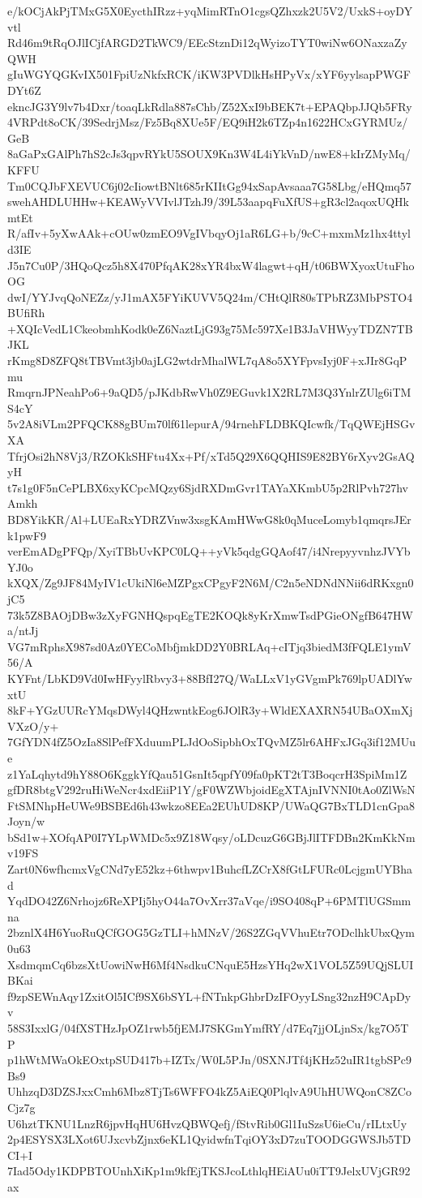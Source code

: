 e/kOCjAkPjTMxG5X0EycthIRzz+yqMimRTnO1cgsQZhxzk2U5V2/UxkS+oyDYvtl
Rd46m9tRqOJlICjfARGD2TkWC9/EEcStznDi12qWyizoTYT0wiNw6ONaxzaZyQWH
gIuWGYQGKvIX501FpiUzNkfxRCK/iKW3PVDlkHsHPyVx/xYF6yylsapPWGFDYt6Z
ekncJG3Y9lv7b4Dxr/toaqLkRdla887sChb/Z52XxI9bBEK7t+EPAQbpJJQb5FRy
4VRPdt8oCK/39SedrjMsz/Fz5Bq8XUe5F/EQ9iH2k6TZp4n1622HCxGYRMUz/GeB
8aGaPxGAlPh7hS2cJs3qpvRYkU5SOUX9Kn3W4L4iYkVnD/nwE8+kIrZMyMq/KFFU
Tm0CQJbFXEVUC6j02cIiowtBNlt685rKIItGg94xSapAvsaaa7G58Lbg/eHQmq57
swehAHDLUHHw+KEAWyVVIvlJTzhJ9/39L53aapqFuXfUS+gR3cl2aqoxUQHkmtEt
R/afIv+5yXwAAk+cOUw0zmEO9VgIVbqyOj1aR6LG+b/9cC+mxmMz1hx4ttyld3IE
J5n7Cu0P/3HQoQcz5h8X470PfqAK28xYR4bxW4lagwt+qH/t06BWXyoxUtuFhoOG
dwI/YYJvqQoNEZz/yJ1mAX5FYiKUVV5Q24m/CHtQlR80sTPbRZ3MbPSTO4BUfiRh
+XQIcVedL1CkeobmhKodk0eZ6NaztLjG93g75Mc597Xe1B3JaVHWyyTDZN7TBJKL
rKmg8D8ZFQ8tTBVmt3jb0ajLG2wtdrMhalWL7qA8o5XYFpvsIyj0F+xJIr8GqPmu
RmqrnJPNeahPo6+9aQD5/pJKdbRwVh0Z9EGuvk1X2RL7M3Q3YnlrZUlg6iTMS4cY
5v2A8iVLm2PFQCK88gBUm70lf61lepurA/94rnehFLDBKQIcwfk/TqQWEjHSGvXA
TfrjOsi2hN8Vj3/RZOKkSHFtu4Xx+Pf/xTd5Q29X6QQHIS9E82BY6rXyv2GsAQyH
t7s1g0F5nCePLBX6xyKCpcMQzy6SjdRXDmGvr1TAYaXKmbU5p2RlPvh727hvAmkh
BD8YikKR/Al+LUEaRxYDRZVnw3xsgKAmHWwG8k0qMuceLomyb1qmqrsJErk1pwF9
verEmADgPFQp/XyiTBbUvKPC0LQ++yVk5qdgGQAof47/i4NrepyyvnhzJVYbYJ0o
kXQX/Zg9JF84MyIV1cUkiNl6eMZPgxCPgyF2N6M/C2n5eNDNdNNii6dRKxgn0jC5
73k5Z8BAOjDBw3zXyFGNHQspqEgTE2KOQk8yKrXmwTsdPGieONgfB647HWa/ntJj
VG7mRphsX987sd0Az0YECoMbfjmkDD2Y0BRLAq+cITjq3biedM3fFQLE1ymV56/A
KYFnt/LbKD9Vd0IwHFyylRbvy3+88BfI27Q/WaLLxV1yGVgmPk769lpUADlYwxtU
8kF+YGzUURcYMqsDWyl4QHzwntkEog6JOlR3y+WldEXAXRN54UBaOXmXjVXzO/y+
7GfYDN4fZ5OzIa8SlPefFXduumPLJdOoSipbhOxTQvMZ5lr6AHFxJGq3if12MUue
z1YaLqhytd9hY88O6KggkYfQau51GsnIt5qpfY09fa0pKT2tT3BoqcrH3SpiMm1Z
gfDR8btgV292ruHiWeNcr4xdEiiP1Y/gF0WZWbjoidEgXTAjnIVNNI0tAo0ZlWsN
FtSMNhpHeUWe9BSBEd6h43wkzo8EEa2EUhUD8KP/UWaQG7BxTLD1cnGpa8Joyn/w
bSd1w+XOfqAP0I7YLpWMDc5x9Z18Wqsy/oLDcuzG6GBjJlITFDBn2KmKkNmv19FS
Zart0N6wfhcmxVgCNd7yE52kz+6thwpv1BuhcfLZCrX8fGtLFURc0LcjgmUYBhad
YqdDO42Z6Nrhojz6ReXPIj5hyO44a7OvXrr37aVqe/i9SO408qP+6PMTlUGSmmna
2bznlX4H6YuoRuQCfGOG5GzTLI+hMNzV/26S2ZGqVVhuEtr7ODclhkUbxQym0u63
XsdmqmCq6bzsXtUowiNwH6Mf4NsdkuCNquE5HzsYHq2wX1VOL5Z59UQjSLUIBKai
f9zpSEWnAqy1ZxitOl5ICf9SX6bSYL+fNTnkpGhbrDzIFOyyLSng32nzH9CApDyv
58S3IxxlG/04fXSTHzJpOZ1rwb5fjEMJ7SKGmYmfRY/d7Eq7jjOLjnSx/kg7O5TP
p1hWtMWaOkEOxtpSUD417b+IZTx/W0L5PJn/0SXNJTf4jKHz52uIR1tgbSPc9Bs9
UhhzqD3DZSJxxCmh6Mbz8TjTs6WFFO4kZ5AiEQ0PlqlvA9UhHUWQonC8ZCoCjz7g
U6hztTKNU1LnzR6jpvHqHU6HvzQBWQefj/fStvRib0Gl1IuSzsU6ieCu/rILtxUy
2p4ESYSX3LXot6UJxcvbZjnx6eKL1QyidwfnTqiOY3xD7zuTOODGGWSJb5TDCI+I
7Iad5Ody1KDPBTOUnhXiKp1m9kfEjTKSJcoLthlqHEiAUu0iTT9JelxUVjGR92ax
